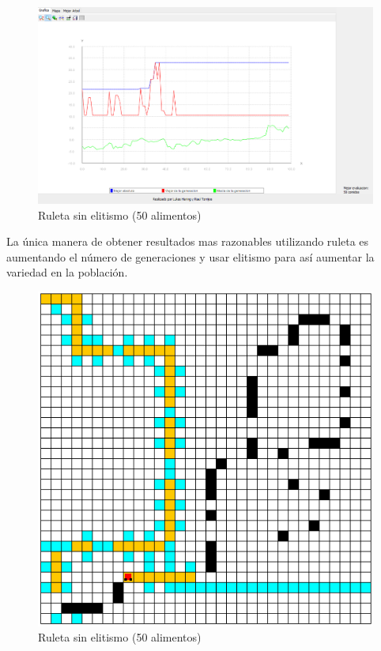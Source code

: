 \documentclass{article}
\begin{document}
\\
\begin{figure}[h]
	\centering
	\includegraphics[scale=0.4]{./images/3rul1.png}
	\caption{Ruleta sin elitismo (50 alimentos)}
\end{figure}

La única manera de obtener resultados mas razonables utilizando ruleta es aumentando el número de generaciones y usar elitismo para así aumentar la variedad en la población.
\begin{figure}[h]
	\centering
	\includegraphics[scale=0.5]{./images/3rul2.png}
	\caption{Ruleta sin elitismo (50 alimentos)}
\end{figure}
\end{document}
